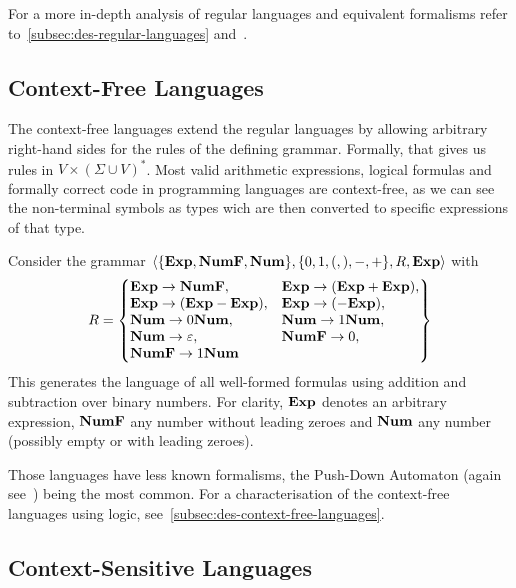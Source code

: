 For a more in-depth analysis of regular languages and equivalent formalisms refer to~\cref{subsec:des-regular-languages} and~\cite{Straubing1994}.

\subsection{Context-Free Languages}\label{subsec:context-free-languages}

The context-free languages extend the regular languages by allowing arbitrary right-hand sides for the rules of the defining grammar.
Formally, that gives us rules in $V\times(\Sigma \cup V)^{*}$.
Most valid arithmetic expressions, logical formulas and formally correct code in programming languages are context-free, as we can see the non-terminal symbols as types wich are then converted to specific expressions of that type.

\begin{exmp}
    Consider the grammar $\langle \{\bold{Exp}, \bold{NumF}, \bold{Num}\}, \{0, 1, (, ), -, +\}, R, \bold{Exp} \rangle$ with
    \[
        R = \begin{Bmatrix*}[l]
                \bold{Exp} \to \bold{NumF},
                &\bold{Exp} \to (\bold{Exp} + \bold{Exp}), \\
                \bold{Exp} \to (\bold{Exp} - \bold{Exp}),
                &\bold{Exp} \to (-\bold{Exp}), \\
                \bold{Num} \to 0\bold{Num},
                &\bold{Num} \to 1\bold{Num}, \\
                \bold{Num} \to \varepsilon,
                &\bold{NumF} \to 0, \\
                \bold{NumF} \to 1\bold{Num}
        \end{Bmatrix*}
    \]
    This generates the language of all well-formed formulas using addition and subtraction over binary numbers.
    For clarity, $\bold{Exp}$ denotes an arbitrary expression, $\bold{NumF}$ any number without leading zeroes and $\bold{Num}$ any number (possibly empty or with leading zeroes).
\end{exmp}

Those languages have less known formalisms, the Push-Down Automaton (again see~\cite{theory-cs}) being the most common.
For a characterisation of the context-free languages using logic, see~\cref{subsec:des-context-free-languages}.

\subsection{Context-Sensitive Languages}\label{subsec:context-sensitive-languages}

